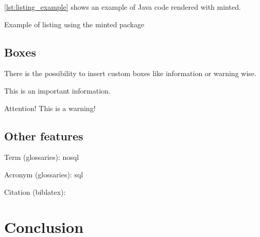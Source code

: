 \autoref{lst:listing_example} shows an example of Java code rendered with minted.

\begin{listing}[H]
	\caption{Example of listing using the minted package}
	\label{lst:listing_example}
\end{listing}

\subsection{Boxes}

There is the possibility to insert custom boxes like information or warning wise.

\begin{info}
    This is an important information.
\end{info}

\begin{warning}
    Attention! This is a warning!
\end{warning}

\subsection{Other features}

Term (glossaries): \gls{nosql}

Acronym (glossaries): \gls{sql}

Citation (biblatex): \cite{paper_millwheel}

\section{Conclusion}

\blindtext
